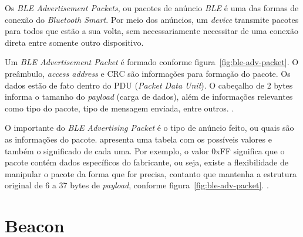 \documentclass[
	12pt,				%
	openright,			%
	oneside,			%
	a4paper,			%
	chapter=TITLE,		%
	english,			%
	brazil				%
	]{abntex2}
\begin{document}
{Os \textit{BLE Advertisement Packets}, ou pacotes de anúncio \textit{BLE} é uma das formas de conexão do \textit{Bluetooth Smart}. Por meio dos anúncios, um \textit{device} transmite pacotes para todos que estão a sua volta, sem necessariamente necessitar de uma conexão direta entre somente outro dispositivo.

Um \textit{BLE Advertisement Packet} é formado conforme figura~\ref{fig:ble-adv-packet}. O preâmbulo, \textit{access address} e CRC são informações para formação do pacote. Os dados estão de fato dentro do PDU (\textit{Packet Data Unit}). O cabeçalho de 2 bytes informa o tamanho do \textit{payload} (carga de dados), além de informações relevantes como tipo do pacote, tipo de mensagem enviada, entre outros. \cite{ble-packets}.

\begin{figure}[h!]
\end{figure}

O importante do \textit{BLE Advertising Packet} é o tipo de anúncio feito, ou quais são as informações do pacote.  apresenta uma tabela com os possíveis valores e também o significado de cada uma. Por exemplo, o valor 0xFF significa que o pacote contém dados específicos do fabricante, ou seja, existe a flexibilidade de manipular o pacote da forma que for precisa, contanto que mantenha a estrutura original de 6 a 37 bytes de \textit{payload}, conforme figura~\ref{fig:ble-adv-packet}. \cite{ble-packets}.

\section{Beacon}

}
\end{document}
